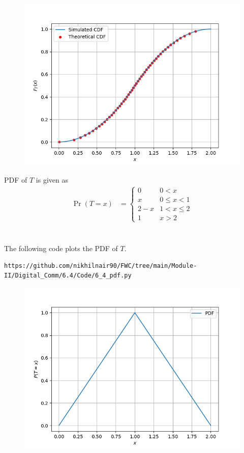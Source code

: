 \documentclass[journal,12pt,twocolumn]{IEEEtran}
\providecommand{\pr}[1]{\ensuremath{\Pr\left(#1\right)}}
\begin{document}
\begin{figure}[h]
    \centering
\includegraphics[width=\columnwidth]{figure/cdf.png}
    \label{fig:my_label}
\end{figure}

 
PDF of $T$ is given as
\begin{align}
\pr{T=x}  &= 
\begin{cases}
0 & 0 < x 
\\
x & 0 \le x < 1
\\
2-x & 1 < x \le 2 
\\
1 &  x > 2                \label{eq:4}
\end{cases}
\end{align}
\\
\\
The following code  plots the PDF of $T$.

\begin{lstlisting}
https://github.com/nikhilnair90/FWC/tree/main/Module-II/Digital_Comm/6.4/Code/6_4_pdf.py
\end{lstlisting}

\begin{figure}[h]
    \centering
\includegraphics[width=\columnwidth]{figure/pdf.png}
    \label{fig:my_label}
\end{figure}
\end{document}

